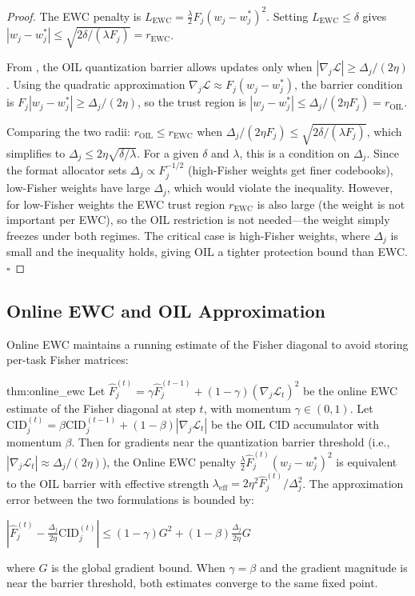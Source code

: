 \begin{proof}
The EWC penalty is $L_{\text{EWC}} = \frac{\lambda}{2} F_j (w_j - w_j^*)^2$. Setting $L_{\text{EWC}} \leq \delta$ gives $|w_j - w_j^*| \leq \sqrt{2\delta / (\lambda F_j)} = r_{\text{EWC}}$.

From , the OIL quantization barrier allows updates only when $|\nabla_j \mathcal{L}| \geq \Delta_j / (2\eta)$. Using the quadratic approximation $\nabla_j \mathcal{L} \approx F_j (w_j - w_j^*)$, the barrier condition is $F_j |w_j - w_j^*| \geq \Delta_j / (2\eta)$, so the trust region is $|w_j - w_j^*| \leq \Delta_j / (2\eta F_j) = r_{\text{OIL}}$.

Comparing the two radii: $r_{\text{OIL}} \leq r_{\text{EWC}}$ when $\Delta_j / (2\eta F_j) \leq \sqrt{2\delta / (\lambda F_j)}$, which simplifies to $\Delta_j \leq 2\eta \sqrt{\delta / \lambda}$. For a given $\delta$ and $\lambda$, this is a condition on $\Delta_j$. Since the format allocator sets $\Delta_j \propto F_j^{-1/2}$ (high-Fisher weights get finer codebooks), low-Fisher weights have large $\Delta_j$, which would violate the inequality. However, for low-Fisher weights the EWC trust region $r_{\text{EWC}}$ is also large (the weight is not important per EWC), so the OIL restriction is not needed---the weight simply freezes under both regimes. The critical case is high-Fisher weights, where $\Delta_j$ is small and the inequality holds, giving OIL a tighter protection bound than EWC. $\square$
\end{proof}

\subsection{Online EWC and OIL Approximation}

Online EWC \cite{schwarz2018} maintains a running estimate of the Fisher diagonal to avoid storing per-task Fisher matrices:

\begin{mythm}{thm:online_ewc}
Let $\hat{F}_j^{(t)} = \gamma \hat{F}_j^{(t-1)} + (1-\gamma) (\nabla_j \mathcal{L}_t)^2$ be the online EWC estimate of the Fisher diagonal at step $t$, with momentum $\gamma \in (0,1)$. Let $\text{CID}_j^{(t)} = \beta \text{CID}_j^{(t-1)} + (1-\beta) |\nabla_j \mathcal{L}_t|$ be the OIL CID accumulator with momentum $\beta$. Then for gradients near the quantization barrier threshold (i.e., $|\nabla_j \mathcal{L}_t| \approx \Delta_j / (2\eta)$), the Online EWC penalty $\frac{\lambda}{2} \hat{F}_j^{(t)} (w_j - w_j^*)^2$ is equivalent to the OIL barrier with effective strength $\lambda_{\text{eff}} = 2\eta^2 \hat{F}_j^{(t)} / \Delta_j^2$. The approximation error between the two formulations is bounded by:

$|\hat{F}_j^{(t)} - \tfrac{\Delta_j}{2\eta} \text{CID}_j^{(t)}| \leq (1-\gamma) G^2 + (1-\beta) \tfrac{\Delta_j}{2\eta} G$

where $G$ is the global gradient bound. When $\gamma = \beta$ and the gradient magnitude is near the barrier threshold, both estimates converge to the same fixed point.
\end{mythm}

